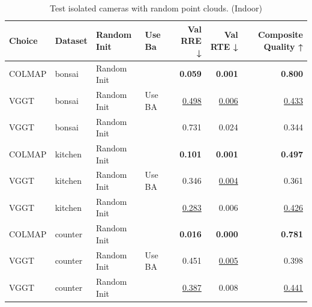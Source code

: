 \begin{table}[H]
\caption{\ifdefined\customcaption \customcaption \else Test isolated cameras with random point clouds. (Indoor) \fi}
\label{tab:06_isolated_cams_indoor}
\centering
\scriptsize
\begin{tabular}{llllrrr}
\toprule
Choice & Dataset & Random Init & Use Ba & Val RRE ↓ & Val RTE ↓ & Composite Quality ↑ \\
\midrule
COLMAP & bonsai & Random Init &  & \textbf{0.059} & \textbf{0.001} & \textbf{0.800} \\
VGGT & bonsai & Random Init & Use BA & \underline{0.498} & \underline{0.006} & \underline{0.433} \\
VGGT & bonsai & Random Init &  & 0.731 & 0.024 & 0.344 \\
\midrule
COLMAP & kitchen & Random Init &  & \textbf{0.101} & \textbf{0.001} & \textbf{0.497} \\
VGGT & kitchen & Random Init & Use BA & 0.346 & \underline{0.004} & 0.361 \\
VGGT & kitchen & Random Init &  & \underline{0.283} & 0.006 & \underline{0.426} \\
\midrule
COLMAP & counter & Random Init &  & \textbf{0.016} & \textbf{0.000} & \textbf{0.781} \\
VGGT & counter & Random Init & Use BA & 0.451 & \underline{0.005} & 0.398 \\
VGGT & counter & Random Init &  & \underline{0.387} & 0.008 & \underline{0.441} \\
\bottomrule
\end{tabular}
\end{table}